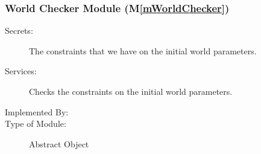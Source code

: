 \documentclass[12pt, titlepage]{article}
\newcommand{\mref}[1]{M\ref{#1}}
\begin{document}




\subsubsection{World Checker Module (\mref{mWorldChecker})}

\begin{description}
\item[Secrets:] The constraints that we have on the initial world parameters.
\item[Services:] Checks the constraints on the initial world parameters.
\item[Implemented By:] \progname{}
\item[Type of Module:] Abstract Object
\end{description}
\end{document}
